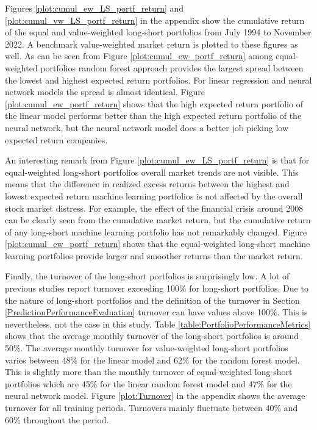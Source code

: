 \documentclass[12pt]{article}
\begin{document}
Figures \ref{plot:cumul_ew_LS_portf_return} and \ref{plot:cumul_vw_LS_portf_return} in the appendix show the cumulative return of the equal and value-weighted long-short portfolios from July 1994 to November 2022. A benchmark value-weighted market return is plotted to these figures as well. As can be seen from Figure \ref{plot:cumul_ew_portf_return} among equal-weighted portfolios random forest approach provides the largest spread between the lowest and highest expected return portfolios. For linear regression and neural network models the spread is almost identical. Figure \ref{plot:cumul_ew_portf_return} shows that the high expected return portfolio of the linear model performs better than the high expected return portfolio of the neural network, but the neural network model does a better job picking low expected return companies. \par

An interesting remark from Figure \ref{plot:cumul_ew_LS_portf_return} is that for equal-weighted long-short portfolios overall market trends are not visible. This means that the difference in realized excess returns between the highest and lowest expected return machine learning portfolios is not affected by the overall stock market distress. For example, the effect of the financial crisis around 2008 can be clearly seen from the cumulative market return, but the cumulative return of any long-short machine learning portfolio has not remarkably changed. Figure \ref{plot:cumul_ew_portf_return} shows that the equal-weighted long-short machine learning portfolios provide larger and smoother returns than the market return. \par

Finally, the turnover of the long-short portfolios is surprisingly low. A lot of previous studies report turnover exceeding 100\% for long-short portfolios.\footnotemark {} Due to the nature of long-short portfolios and the definition of the turnover in Section \ref{PredictionPerformanceEvaluation} turnover can have values above 100\%. This is nevertheless, not the case in this study. Table \ref{table:PortfolioPerformanceMetrics} shows that the average monthly turnover of the long-short portfolios is around 50\%. The average monthly turnover for value-weighted long-short portfolios varies between 48\% for the linear model and 62\% for the random forest model. This is slightly more than the monthly turnover of equal-weighted long-short portfolios which are 45\% for the linear random forest model and 47\% for the neural network model. Figure \ref{plot:Turnover} in the appendix shows the average turnover for all training periods. Turnovers mainly fluctuate between 40\% and 60\% throughout the period. \par
\end{document}

